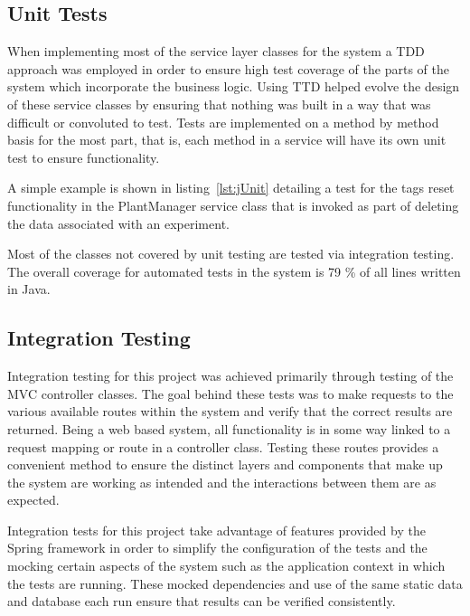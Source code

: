 \subsection{Unit Tests}

 When implementing most of the service layer classes for the system a TDD approach was employed in order to ensure high test coverage of the parts of the system which incorporate the business logic. Using TTD helped evolve the design of these service classes by ensuring that nothing was built in a way that was difficult or convoluted to test. Tests are implemented on a method by method basis for the most part, that is, each method in a service will have its own unit test to ensure functionality.
 
  A simple example is shown in listing~\ref{lst:jUnit} detailing a test for the tags reset functionality in the PlantManager service class that is invoked as part of deleting the data associated with an experiment.
\lstjava

Most of the classes not covered by unit testing are tested via integration testing. The overall coverage for automated tests in the system is 79 \% of all lines written in Java.

\subsection{Integration Testing}

Integration testing for this project was achieved primarily through testing of the MVC controller classes. The goal behind these tests was to make requests to the various available routes within the system and verify that the correct results are returned. Being a web based system, all functionality is in some way linked to a request mapping or route in a controller class. Testing these routes provides a convenient method to ensure the distinct layers and components that make up the system are working as intended and the interactions between them are as expected. 

Integration tests for this project take advantage of features provided by the Spring framework in order to simplify the configuration of the tests and the mocking certain aspects of the system such as the application context in which the tests are running. These mocked dependencies and use of the same static data and database each run ensure that results can be verified consistently.

